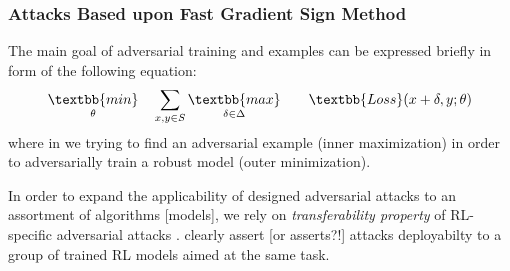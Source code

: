 \documentclass[a4paper,12pt]{article}
\begin{document}










\subsubsection{Attacks Based upon Fast Gradient Sign Method}



The main goal of adversarial training and examples can be expressed briefly in form of the following equation:
\begin{equation*}
\begin{aligned}
& \underset{\theta}{\textbb{min}}
& & \sum_{x,y \in S} \underset{\delta \in \Delta}{\textbb{max}}
& & & \textbb{Loss}(x + \delta, y; \theta)
\end{aligned}
\end{equation*}
where in we trying to find an adversarial example (inner maximization) in order to adversarially train a robust model (outer minimization).


In order to expand the applicability of designed adversarial attacks to an assortment of algorithms [models], we rely on \textit{transferability property} of RL-specific adversarial attacks \cite{Szegedy2014, Papernot2016, Goodfellow2014a}. \citet{Huang2017} clearly assert [or asserts?!] attacks deployabilty to a group of trained RL models aimed at the same task.  
\end{document}
